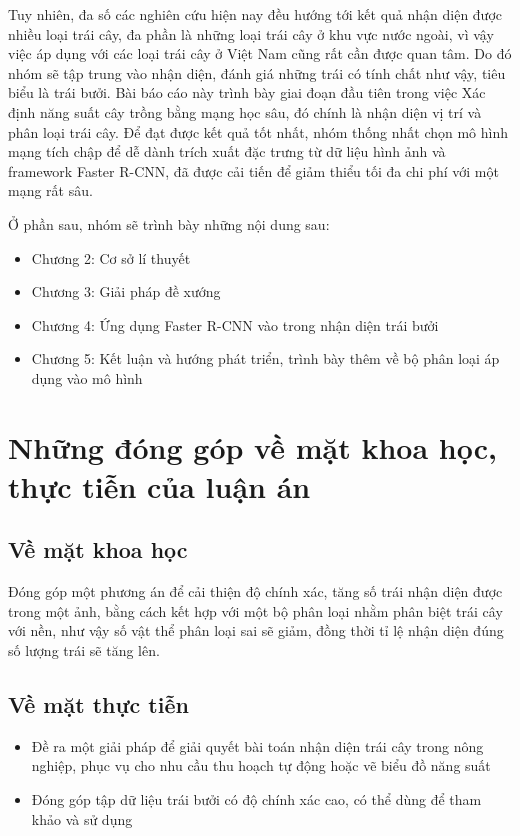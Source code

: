 Tuy nhiên, đa số các nghiên cứu hiện nay đều hướng tới kết quả nhận diện được nhiều loại trái cây, đa phần là những loại trái cây ở khu vực nước ngoài, vì vậy việc áp dụng với các loại trái cây ở Việt Nam cũng rất cần được quan tâm. Do đó nhóm sẽ tập trung vào nhận diện, đánh giá những trái có tính chất như vậy, tiêu biểu là trái bưởi. Bài báo cáo này trình bày giai đoạn đầu tiên trong việc Xác định năng suất cây trồng bằng mạng học sâu, đó chính là nhận diện vị trí và phân loại trái cây. Để đạt được kết quả tốt nhất, nhóm thống nhất chọn mô hình mạng tích chập để dễ dành trích xuất đặc trưng từ  dữ liệu hình ảnh và framework Faster R-CNN, đã được cải tiến để giảm thiểu tối đa chi phí với một mạng rất sâu.

Ở phần sau, nhóm sẽ trình bày những nội dung sau:
\begin{itemize}
	\item Chương 2: Cơ sở lí thuyết
	\item Chương 3: Giải pháp đề xướng
	\item Chương 4: Ứng dụng Faster R-CNN vào trong nhận diện trái bưởi
	\item Chương 5: Kết luận và hướng phát triển, trình bày thêm về bộ phân loại áp dụng vào mô hình
\end{itemize} 

\section{Những đóng góp về mặt khoa học, thực tiễn của luận án}
\subsection{Về mặt khoa học}
Đóng góp một phương án để cải thiện độ chính xác, tăng số trái nhận diện được trong một ảnh, bằng cách kết hợp với một bộ phân loại nhằm phân biệt trái cây với nền, như vậy số vật thể phân loại sai sẽ giảm, đồng thời tỉ lệ nhận diện đúng số lượng trái sẽ tăng lên.
\subsection{Về mặt thực tiễn}
\begin{itemize}
	\item Đề ra một giải pháp để giải quyết bài toán nhận diện trái cây trong nông nghiệp, phục vụ cho nhu cầu thu hoạch tự động hoặc vẽ biểu đồ năng suất
	\item Đóng góp tập dữ liệu trái bưởi có độ chính xác cao, có thể dùng để tham khảo và sử dụng
\end{itemize}
